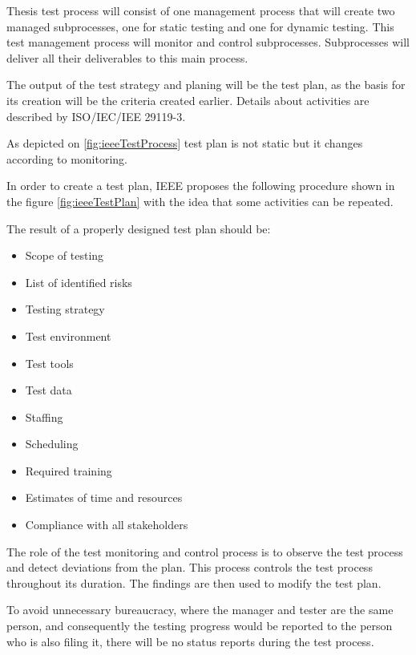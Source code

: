 
Thesis test process will consist of one management process that will create two managed subprocesses, one for static testing and one for dynamic testing. This test management process will monitor and control subprocesses. Subprocesses will deliver all their deliverables to this main process.

The output of the test strategy and planing will be the test plan, as the basis for its creation will be the criteria created earlier. Details about activities are described by ISO/IEC/IEE 29119-3.

As depicted on \ref{fig:ieeeTestProcess} test plan is not static but it changes according to monitoring.


In order to create a test plan, IEEE proposes the following procedure shown in the figure \ref{fig:ieeeTestPlan} with the idea that some activities can be repeated.

The result of a properly designed test plan should be:
\begin{itemize}
    \item Scope of testing
    \item List of identified risks
    \item Testing strategy
    \item Test environment
    \item Test tools
    \item Test data
    \item Staffing
    \item Scheduling
    \item Required training
    \item Estimates of time and resources
    \item Compliance with all stakeholders
\end{itemize}

The role of the test monitoring and control process is to observe the test process and detect deviations from the plan. This process controls the test process throughout its duration. The findings are then used to modify the test plan.

To avoid unnecessary bureaucracy, where the manager and tester are the same person, and consequently the testing progress would be reported to the person who is also filing it, there will be no status reports during the test process.

